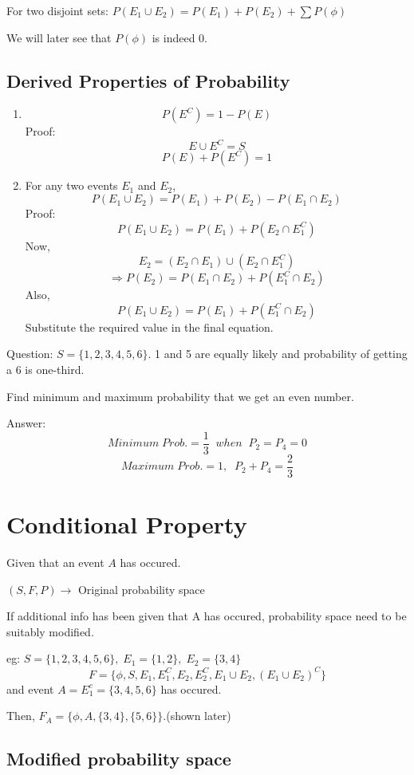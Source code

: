\documentclass{article}
\begin{document}
For two disjoint sets:
$P(E_1 \cup E_2)= P(E_1)+P(E_2)+ \sum P(\phi)$

We will later see that $P(\phi)$ is indeed 0.

\subsection{Derived Properties of Probability}
\begin{enumerate}
    \item $$P(E^C)=1-P(E)$$
        Proof:$$E \cup E^C = S$$
            $$P(E)+P(E^C)=1$$

    \item For any two events $E_1$ and $E_2$,
    $$ P(E_1 \cup E_2)= P(E_1)+P(E_2)-P(E_1 \cap E_2)$$
    Proof:
    $$ P(E_1 \cup E_2)=P(E_1)+P(E_2 \cap E_1^C)$$
    Now, $$ E_2=(E_2 \cap E_1)\cup (E_2 \cap E_1^C)$$
    $$ \Rightarrow P(E_2)=P(E_1 \cap E_2)+ P(E_1^C \cap E_2)$$
    Also,
    $$ P(E_1 \cup E_2)= P(E_1)+P(E_1^C \cap E_2)$$
    Substitute the required value in the final equation.
\end{enumerate}

Question:
$ S=\{1,2,3,4,5,6\}$. 1 and 5 are equally likely and probability of getting a 6 is one-third.

Find minimum and maximum probability that we get an even number.

Answer:$$ Minimum \;Prob. = \frac{1}{3} \;\; when \;\; P_2 = P_4 = 0$$
$$ Maximum \;Prob. = 1,  \;\; P_2+P_4 =\frac{2}{3}  $$


\section{Conditional Property}

Given that an event $A$ has occured.

$ (S,F,P) \rightarrow$ Original probability space

If additional info has been given that A has occured, probability space need to be suitably modified.

eg: $S=\{1,2,3,4,5,6\},\;E_1=\{1,2\},\;E_2=\{3,4\}$
$$ F=\{\phi , S, E_1 , E_{1}^{C},E_2 , E_{2}^{C},E_1 \cup E_2 , (E_{1} \cup E_{2})^{C}\}$$
and event $A=E_1^c = \{3,4,5,6\}$ has occured.

Then, $ F_A= \{ \phi, A, \{3,4\},\{5,6\} \} $.(shown later)


\subsection{Modified probability space}
\end{document}
